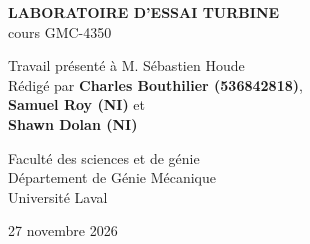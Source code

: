 \begin{titlepage}
\centering

\vspace*{1cm}

{\Large \textbf{LABORATOIRE D'ESSAI TURBINE}} \\[0.5cm]
{\large cours GMC-4350} \\[0.5cm]


\vfill

Travail présenté à M. Sébastien Houde \\ [0.25cm]
Rédigé par \textbf{Charles Bouthilier (536842818)},\\
 \textbf{Samuel Roy (NI)} et \\
 \textbf{Shawn Dolan (NI)}

\vfill

Faculté des sciences et de génie \\ [0.25cm]
Département de Génie Mécanique \\ [0.25cm]
Université Laval

\vspace{0.5cm}

27 novembre 2026

\end{titlepage}
